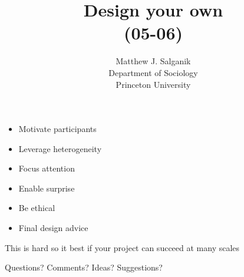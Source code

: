 \documentclass[aspectratio=169]{beamer}
\title[]{Design your own\\(05-06)}
\author[]{Matthew J. Salganik\\Department of Sociology\\Princeton University}
\date[]{Soc 596: Computational Social Science\\Fall 2016
\vfill
\begin{flushright}
\vspace{0.6in}
\texttt{[image: figures/cc.png]}
\end{flushright}
}
\begin{document}
\frame{\titlepage}
\begin{frame}

\begin{itemize}
\item Motivate participants
\item Leverage heterogeneity
\item Focus attention
\item Enable surprise
\item Be ethical
\item Final design advice
\end{itemize}

\end{frame}
\begin{frame}

This is hard so it best if your project can succeed at many scales

\end{frame}
\begin{frame}

{\Large
\begin{center}
Questions?  Comments?  Ideas? Suggestions?
\end{center}
}

\end{frame}
\end{document}
